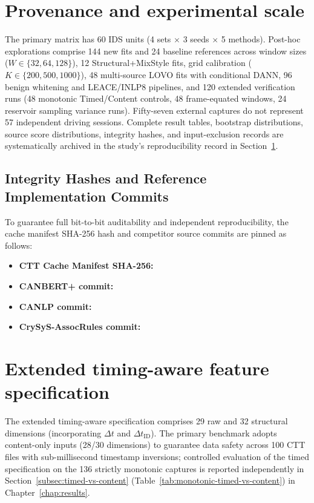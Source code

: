 \documentclass[12pt, a4paper, reqno, oneside]{book}
\begin{document}
\section{Provenance and experimental scale}\label{sec:app-provenance}
The primary matrix has 60 IDS units (4 sets $\times$ 3 seeds $\times$ 5 methods). Post-hoc explorations comprise 144 new fits and 24 baseline references across window sizes ($W \in \{32, 64, 128\}$), 12 Structural+MixStyle fits, grid calibration ($K \in \{200, 500, 1000\}$), 48 multi-source LOVO fits with conditional DANN, 96 benign whitening and LEACE/INLP8 pipelines, and 120 extended verification runs (48 monotonic Timed/Content controls, 48 frame-equated windows, 24 reservoir sampling variance runs). Fifty-seven external captures do not represent 57 independent driving sessions. Complete result tables, bootstrap distributions, source score distributions, integrity hashes, and input-exclusion records are systematically archived in the study's reproducibility record in Section~\ref{sec:app-provenance}.

\subsection{Integrity Hashes and Reference Implementation Commits}\label{subsec:app-hashes}
To guarantee full bit-to-bit auditability and independent reproducibility, the cache manifest SHA-256 hash and competitor source commits are pinned as follows:
\begin{itemize}
    \item \textbf{CTT Cache Manifest SHA-256:} \texttt{}
    \item \textbf{CANBERT+ commit:} \texttt{}
    \item \textbf{CANLP commit:} \texttt{}
    \item \textbf{CrySyS-AssocRules commit:} \texttt{}
\end{itemize}

\section{Extended timing-aware feature specification}
The extended timing-aware specification comprises 29 raw and 32 structural dimensions (incorporating $\Delta t$ and $\Delta t_{\text{ID}}$). The primary benchmark adopts content-only inputs (28/30 dimensions) to guarantee data safety across 100 CTT files with sub-millisecond timestamp inversions; controlled evaluation of the timed specification on the 136 strictly monotonic captures is reported independently in Section~\ref{subsec:timed-vs-content} (Table~\ref{tab:monotonic-timed-vs-content}) in Chapter~\ref{chap:results}.
\end{document}
